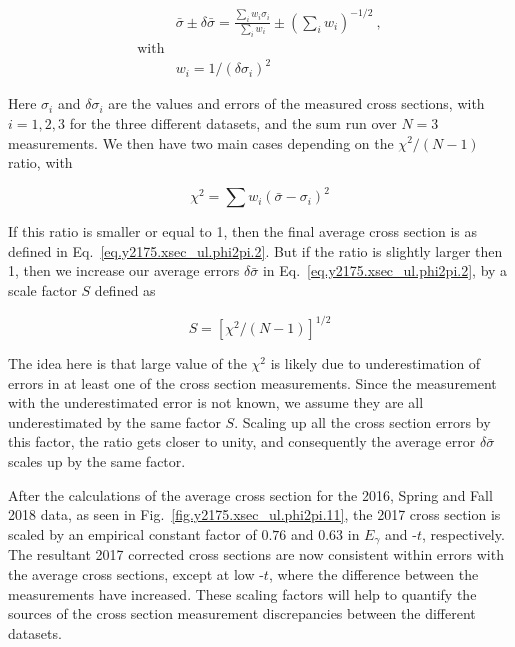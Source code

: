 \begin{equation}
    \label{eq.y2175.xsec_ul.phi2pi.2}
    \begin{aligned}
        & \bar{\sigma} \pm \delta\bar{\sigma} = \frac{\sum_{i}w_{i}\sigma_{i}}{\sum_{i}w_{i}} \pm  \left(\sum_{i}w_{i}\right)^{-1/2}~, \\
        \mathrm{with}\\
        & w_{i} = 1/(\delta \sigma_{i})^2
    \end{aligned}
\end{equation}

\noindent Here $\sigma_{i}$ and $\delta \sigma_{i}$ are the values and errors of the measured cross sections, with $i=1,2,3$ for the three different datasets, and the sum run over $N=3$ measurements. We then have two main cases depending on the $\chi^{2}/(N-1)$ ratio, with 

\begin{equation}
    \label{eq.y2175.xsec_ul.phi2pi.3}
    \chi^{2} = \sum w_{i}(\bar{\sigma}-\sigma_{i})^2
\end{equation}

If this ratio is smaller or equal to 1, then the final average cross section is as defined in Eq.~\ref{eq.y2175.xsec_ul.phi2pi.2}. But if the ratio is slightly larger then 1, then we increase our average errors $\delta\bar{\sigma}$ in Eq.~\ref{eq.y2175.xsec_ul.phi2pi.2}, by a scale factor $S$ defined as

\begin{equation}
    \label{eq.y2175.xsec_ul.phi2pi.4}
    S = [\chi^{2}/(N-1)]^{1/2}
\end{equation}

The idea here is that large value of the $\chi^{2}$ is likely due to underestimation of errors in at least one of the cross section measurements. Since the measurement with the underestimated error is not known, we assume they are all underestimated by the same factor $S$. Scaling up all the cross section errors by this factor, the ratio gets closer to unity, and consequently the average error $\delta\bar{\sigma}$ scales up by the same factor.
~\par After the calculations of the average cross section for the 2016, Spring and Fall 2018 data, as seen in Fig.~\ref{fig.y2175.xsec_ul.phi2pi.11}, the 2017 cross section is scaled by an empirical constant factor of $0.76$ and $0.63$ in $E_{\gamma}$ and -$t$, respectively. The resultant 2017 corrected cross sections are now consistent within errors with the average cross sections, except at low -$t$, where the difference between the measurements have increased. These scaling factors will help to quantify the sources of the cross section measurement discrepancies between the different datasets.

